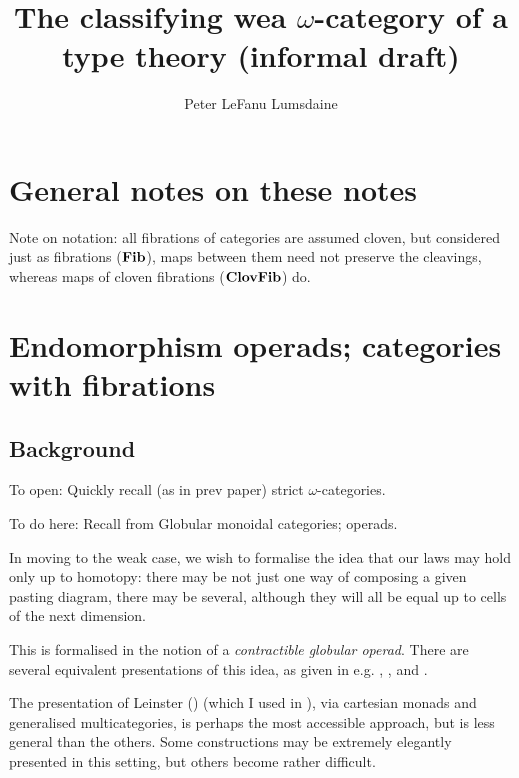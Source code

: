 \documentclass{amsart}
\begin{document}

\title{The classifying wea $\omega$-category of a type theory (informal draft)}

\author[P. LeF. Lumsdaine]{Peter LeFanu Lumsdaine}

\maketitle
\tableofcontents

\section*{General notes on these notes}

Note on notation: all fibrations of categories are assumed cloven, but considered just as fibrations ($\mathbf{Fib}$), maps between them need not preserve the cleavings, whereas maps of cloven fibrations ($\mathbf{ClovFib}$) do.

\section{Endomorphism operads; categories with fibrations} \label{sec:endo-operads}

\subsection{Background}

To open: Quickly recall (as in prev paper) strict $\omega$-categories.

To do here: Recall from \cite{batanin:natural-environment} Globular monoidal categories; operads.

In moving to the weak case, we wish to formalise the idea that our laws may hold only up to homotopy: there may be not just one way of composing a given pasting diagram, there may be several, although they will all be equal up to cells of the next dimension.

This is formalised in the notion of a \emph{contractible globular operad}.  There are several equivalent presentations of this idea, as given in e.g. \cite{batanin:natural-environment}, \cite{leinster:book}, and \cite{weber:operads-within}.

The presentation of Leinster (\cite{leinster:book}) (which I used in \cite{lumsdaine:tlca}), via cartesian monads and generalised multicategories, is perhaps the most accessible approach, but is less general than the others.  Some constructions may be extremely elegantly presented in this setting, but others become rather difficult.
\end{document}
